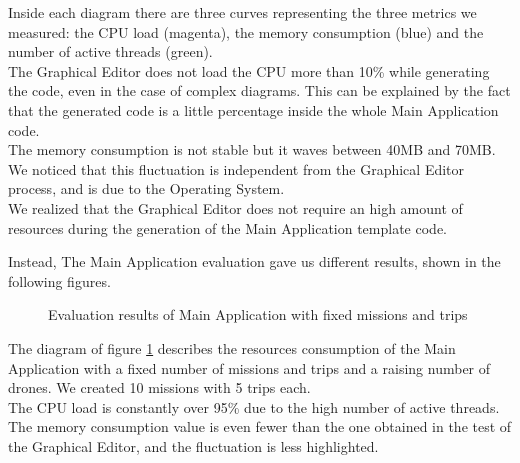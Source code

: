 Inside each diagram there are three curves representing the three metrics we measured: the CPU load (magenta), the memory consumption (blue) and the number of active threads (green).
\\
The Graphical Editor does not load the CPU more than 10\% while generating the code, even in the case of complex diagrams.
This can be explained by the fact that the generated code is a little percentage inside the whole Main Application code.
\\
The memory consumption is not stable but it waves between 40MB and 70MB.
We noticed that this fluctuation is independent from the Graphical Editor process, and is due to the Operating System.
\\
We realized that the Graphical Editor does not require an high amount of resources during the generation of the Main Application template code.
\\

\newpage

Instead, The Main Application evaluation gave us different results, shown in the following figures.
\\

\begin{figure}[h!]
\centering
  \caption{Evaluation results of Main Application with fixed missions and trips}
  \label{fig:mainApp1}
\end{figure}

The diagram of figure \ref{fig:mainApp1} describes the resources consumption of the Main Application with a fixed number of missions and trips and a raising number of drones. We created 10 missions with 5 trips each.
\\
The CPU load is constantly over 95\% due to the high number of active threads.
The memory consumption value is even fewer than the one obtained in the test of the Graphical Editor, and the fluctuation is less highlighted.
\\

